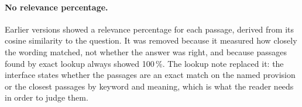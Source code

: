 \paragraph{No relevance percentage.} Earlier versions showed a relevance
percentage for each passage, derived from its cosine similarity to the
question. It was removed because it measured how closely the wording matched,
not whether the answer was right, and because passages found by exact lookup
always showed 100\,\%. The lookup note replaced it: the interface states
whether the passages are an exact match on the named provision or the closest
passages by keyword and meaning, which is what the reader needs in order to
judge them.
